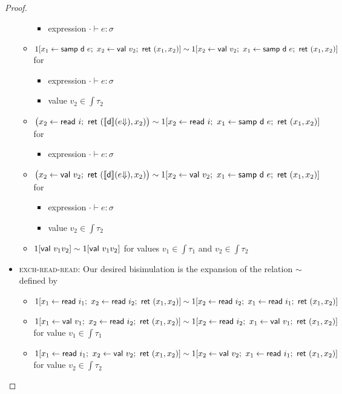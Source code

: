 \begin{proof}
\begin{itemize}
\begin{itemize}
\begin{itemize}
\item expression $\cdot \vdash e : \sigma$
\end{itemize}
\item $1[x_1 \leftarrow \samp{\dist}{e}; \ x_2 \leftarrow \val{v_2}; \ \ret{(x_1,x_2)}] \sim 1[x_2 \leftarrow \val{v_2}; \ x_1 \leftarrow \samp{\dist}{e}; \ \ret{(x_1,x_2)}]$ for
\begin{itemize}
\item expression $\cdot \vdash e : \sigma$
\item value $v_2 \in \int{\tau_2}$
\end{itemize}
\item $\big(x_2 \leftarrow \read{i}; \ \ret{(\int{\dist}(\eval{e}),x_2)}\big) \sim 1[x_2 \leftarrow \read{i}; \ x_1 \leftarrow \samp{\dist}{e}; \ \ret{(x_1,x_2)}]$ for
\begin{itemize}
\item expression $\cdot \vdash e : \sigma$
\end{itemize}
\item $\big(x_2 \leftarrow \val{v_2}; \ \ret{(\int{\dist}(\eval{e}),x_2)}\big) \sim 1[x_2 \leftarrow \val{v_2}; \ x_1 \leftarrow \samp{\dist}{e}; \ \ret{(x_1,x_2)}]$ for
\begin{itemize}
\item expression $\cdot \vdash e : \sigma$
\item value $v_2 \in \int{\tau_2}$
\end{itemize}
\item $1[\mathsf{val} \ v_1 v_2] \sim 1[\mathsf{val} \ v_1 v_2]$ for values $v_1 \in \int{\tau_1}$ and $v_2 \in \int{\tau_2}$
\end{itemize}
\item \textsc{exch-read-read}: Our desired bisimulation is the expansion of the relation $\sim$ defined by
\begin{itemize}
\item $1[x_1 \leftarrow \read{i_1}; \ x_2 \leftarrow \read{i_2}; \ \ret{(x_1,x_2)}] \sim 1[x_2 \leftarrow \read{i_2}; \ x_1 \leftarrow \read{i_1}; \ \ret{(x_1,x_2)}]$
\item $1[x_1 \leftarrow \mathsf{val} \ v_1; \ x_2 \leftarrow \mathsf{read} \ i_2; \ \mathsf{ret} \ (x_1,x_2)] \sim 1[x_2 \leftarrow \mathsf{read} \ i_2; \ x_1 \leftarrow \mathsf{val} \ v_1; \ \mathsf{ret} \ (x_1,x_2)]$ for value $v_1 \in \int{\tau_1}$
\item $1[x_1 \leftarrow \mathsf{read} \ i_1; \ x_2 \leftarrow \mathsf{val} \ v_2; \ \mathsf{ret} \ (x_1,x_2)] \sim 1[x_2 \leftarrow \mathsf{val} \ v_2; \ x_1 \leftarrow \mathsf{read} \ i_1; \ \mathsf{ret} \ (x_1,x_2)]$ for value $v_2 \in \int{\tau_2}$

\end{itemize}
\end{itemize}
\end{proof}

